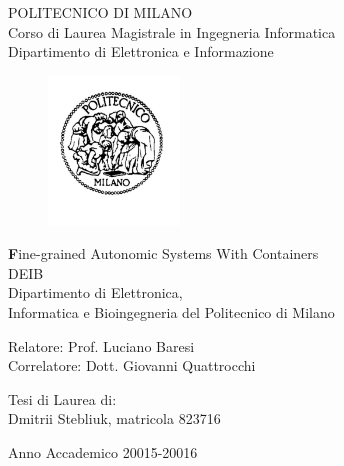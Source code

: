 \thispagestyle{empty}
\vspace*{-1.5cm} \bfseries{
\begin{center}
  \large
  POLITECNICO DI MILANO\\
  \normalsize
  Corso di Laurea Magistrale in Ingegneria Informatica\\
  Dipartimento di Elettronica e Informazione\\
  \begin{figure}[htbp]
    \begin{center}
      \includegraphics[width=3.5cm]{./pictures/logopm}
    \end{center}
  \end{figure}
  \vspace*{0.3cm} \LARGE



  \textbf Fine-grained Autonomic Systems With Containers\\



  \vspace*{.75truecm} \large
  DEIB \\
  Dipartimento di Elettronica,   \\
  Informatica e Bioingegneria del Politecnico di Milano
\end{center}
\vspace*{3.0cm} \large
\begin{flushleft}


  Relatore: Prof. Luciano Baresi \\
  Correlatore: Dott. Giovanni Quattrocchi 

\end{flushleft}
\vspace*{1.0cm}
\begin{flushright}


  Tesi di Laurea di:\\ Dmitrii Stebliuk, matricola 823716 \\ 


\end{flushright}
\vspace*{0.5cm}
\begin{center}



  Anno Accademico 20015-20016
\end{center} \clearpage
}
